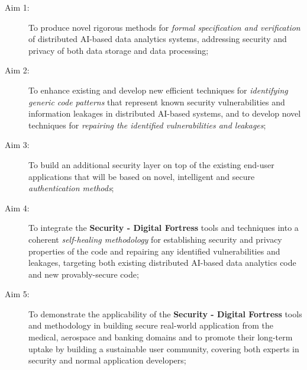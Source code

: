 \documentclass[a4paper,11pt]{article}
\newcommand{\project}[1]{\textbf{#1}\xspace}
\newcommand{\SECURITY}{\project{Security - Digital Fortress}}
\newcommand{\TheProject}{\SECURITY}
\begin{document}
\begin{description}
\item[Aim 1:] To produce novel rigorous methods for \emph{formal specification and verification} of 
  distributed AI-based data analytics systems, addressing security and privacy of both data storage and data processing;

\item[Aim 2:] To %
enhance existing and develop new efficient techniques for \emph{identifying generic code patterns} that
  represent known security vulnerabilities and information leakages in distributed AI-based systems, and to develop novel techniques for  
  \emph{repairing the identified vulnerabilities and leakages};

\item[Aim 3:] To build an additional security layer on top of the existing end-user applications that will be based on novel, intelligent and secure \emph{authentication methods};

\item[Aim 4:] To integrate the \TheProject{} tools and techniques into a coherent \emph{self-healing methodology} for establishing
  security and privacy properties of the code and repairing any identified vulnerabilities and leakages, targeting both 
  existing distributed AI-based data analytics code and new provably-secure code;

\item[Aim 5:]  To demonstrate the applicability of the \TheProject{} tools and
 methodology in building secure real-world application from the medical, aerospace and
 banking domains and to promote their long-term uptake by building a sustainable user community,
 covering both experts in security and normal application developers;

\end{description}
\end{document}
